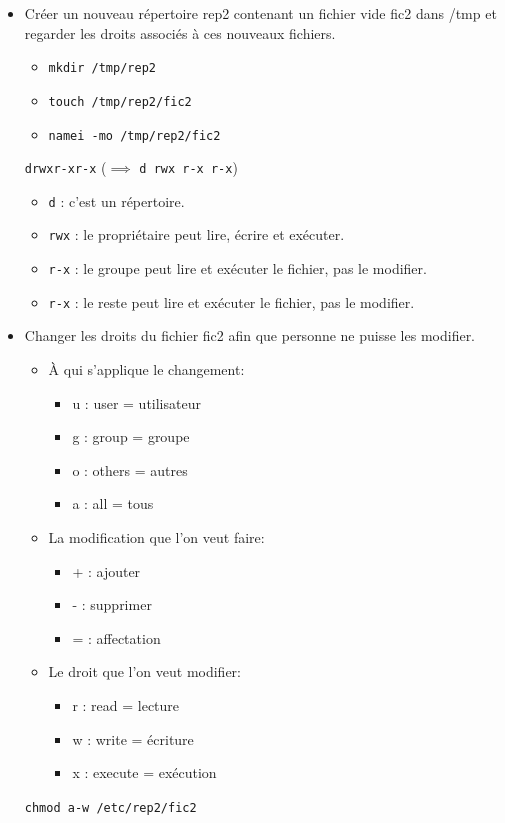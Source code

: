 \documentclass[a4paper]{article}
\begin{document}
\begin{itemize}
\item Créer un nouveau répertoire rep2 contenant un fichier vide fic2 dans /tmp et regarder les droits associés à ces nouveaux fichiers.
\begin{example}
    \begin{itemize}
        \item \texttt{mkdir /tmp/rep2}
        \item \texttt{touch /tmp/rep2/fic2}
        \item \texttt{namei -mo /tmp/rep2/fic2}
    \end{itemize}
    \texttt{drwxr-xr-x} ($ \implies $ \texttt{d rwx r-x r-x})
    \begin{itemize}
        \item \texttt{d} : c'est un répertoire.
        \item \texttt{rwx} : le propriétaire peut lire, écrire et exécuter.
        \item \texttt{r-x} : le groupe peut lire et exécuter le fichier, pas le modifier.
        \item \texttt{r-x} : le reste peut lire et exécuter le fichier, pas le modifier.
    \end{itemize}
\end{example}

\item Changer les droits du fichier fic2 afin que personne ne puisse les modifier.
\begin{example}
    \begin{itemize}
        \item À qui s'applique le changement:
        \begin{itemize}
            \item u : user = utilisateur
            \item g : group = groupe
            \item o : others = autres
            \item a : all = tous
        \end{itemize}
        \item La modification que l'on veut faire:
        \begin{itemize}
            \item + : ajouter
            \item - : supprimer
            \item = : affectation
        \end{itemize}
        \item Le droit que l'on veut modifier:
        \begin{itemize}
            \item r : read = lecture
            \item w : write = écriture
            \item x : execute = exécution
        \end{itemize}
    \end{itemize}
    \texttt{chmod a-w /etc/rep2/fic2}
\end{example}


\end{itemize}
\end{document}
